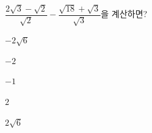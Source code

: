 $\dfrac{2\sqrt{3}-\sqrt{2}}{\sqrt{2}}-\dfrac{\sqrt{18}+\sqrt{3}}{\sqrt{3}}$을 계산하면?
\begin{choices32}{\rule[-3ex]{0pt}{8ex}$-2\sqrt{6}$}{\rule[-3ex]{0pt}{8ex}$-2$}{\rule[-3ex]{0pt}{8ex}$-1$}{\rule[-3ex]{0pt}{8ex}$2$}{\rule[-3ex]{0pt}{8ex}$2\sqrt{6}$}\end{choices32}
